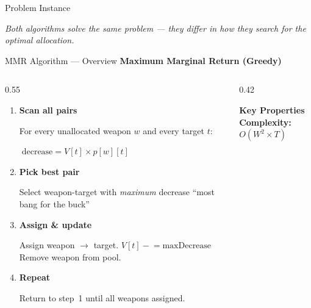 \documentclass[aspectratio=169,10pt]{beamer}
\begin{document}
\begin{frame}{Problem Instance}
  \vspace{0.25cm}
  \colorbox{navymidHex}{\begin{minipage}{\linewidth}
    {\color{graylt}\small\itshape
     Both algorithms solve the same problem ---
     they differ in \emph{how} they search for the optimal allocation.}
  \end{minipage}}
\end{frame}

\begin{frame}{MMR Algorithm --- Overview}
  {\large\bfseries\color{navydark} Maximum Marginal Return (Greedy)}\par
  \vspace{3pt}
  \begin{columns}[T]
    \begin{column}{0.55\textwidth}
      \begin{enumerate}\itemsep10pt
        \item \textbf{Scan all pairs}
          \par {\small For every unallocated weapon $w$ and every target $t$:}
          \par {\small\colorbox{navymidHex}{\color{teallt}
            $\;\text{decrease} = V[t] \times p[w][t]\;$}}
        \item \textbf{Pick best pair}
          \par {\small Select weapon-target with \emph{maximum} decrease}
          {\small\color{mygray} ``most bang for the buck''}
        \item \textbf{Assign \& update}
          \par {\small Assign weapon $\to$ target.\quad
            $V[t] \mathrel{-}= \text{maxDecrease}$}
          {\small Remove weapon from pool.}
        \item \textbf{Repeat}
          \par {\small Return to step~1 until all weapons assigned.}
      \end{enumerate}
    \end{column}
    \begin{column}{0.42\textwidth}
      \colorbox{offwhiteHex}{\begin{minipage}{\linewidth}
        \vspace{6pt}
        {\small\bfseries\color{teal} Key Properties}\\[6pt]
        {\small\color{navydark}\bfseries Complexity:\;}
          {\small $O(W^2 \times T)$}\\[5pt]

\end{minipage}}
\end{column}
\end{columns}
\end{frame}
\end{document}
